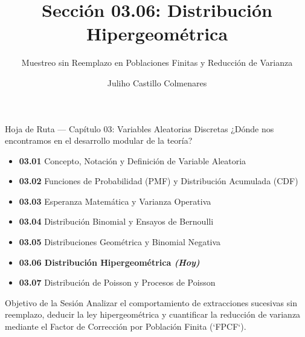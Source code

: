 \documentclass[10pt, aspectratio=169]{beamer}
\title[Distribución Hipergeométrica]{Sección 03.06: Distribución Hipergeométrica}
\subtitle{Muestreo sin Reemplazo en Poblaciones Finitas y Reducción de Varianza}
\author[J. Castillo Colmenares]{Juliho Castillo Colmenares}
\institute{Tecnológico de Monterrey}
\date{\vspace{-1.2cm}}
\begin{document}
\begin{frame}[plain]
  \vspace{-0.8cm}
  \titlepage
\end{frame}

\begin{frame}{Hoja de Ruta — Capítulo 03: Variables Aleatorias Discretas}
  \footnotesize
  ¿Dónde nos encontramos en el desarrollo modular de la teoría? \pause
  \begin{itemize}\itemsep=0.08em
    \item \textbf{03.01} Concepto, Notación y Definición de Variable Aleatoria \pause
    \item \textbf{03.02} Funciones de Probabilidad (PMF) y Distribución Acumulada (CDF) \pause
    \item \textbf{03.03} Esperanza Matemática y Varianza Operativa \pause
    \item \textbf{03.04} Distribución Binomial y Ensayos de Bernoulli \pause
    \item \textbf{03.05} Distribuciones Geométrica y Binomial Negativa \pause
    \item \color{TecRojo}\textbf{03.06 Distribución Hipergeométrica \emph{(Hoy)}}\color{black} \pause
    \item \textbf{03.07} Distribución de Poisson y Procesos de Poisson
  \end{itemize}
  \vspace{-0.1cm}
  \begin{block}{Objetivo de la Sesión}
    Analizar el comportamiento de extracciones sucesivas sin reemplazo, deducir la ley hipergeométrica y cuantificar la reducción de varianza mediante el Factor de Corrección por Población Finita (`FPCF`).
  \end{block}
\end{frame}
\end{document}
